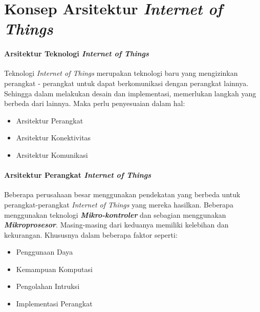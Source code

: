 

\section{Konsep Arsitektur \textit{Internet of Things}}
\begin{frame}{\insertsectionhead}
	\framesubtitle{Arsitektur Teknologi \textit{Internet of Things}}
	\justifying
	Teknologi \textit{Internet of Things} merupakan teknologi baru yang mengizinkan perangkat - perangkat untuk dapat berkomunikasi dengan perangkat lainnya. Sehingga dalam melakukan desain dan implementasi, memerlukan langkah yang berbeda dari lainnya. Maka perlu penyesuaian dalam hal:
	\begin{itemize}
		\item Arsitektur Perangkat
		\item Arsitektur Konektivitas
		\item Arsitektur Komunikasi
	\end{itemize}
\end{frame}

\begin{frame}{\insertsectionhead}
	\framesubtitle{Arsitektur Perangkat \textit{Internet of Things}}
	\justifying
	Beberapa perusahaan besar menggunakan pendekatan yang berbeda untuk perangkat-perangkat \textit{Internet of Things} yang mereka hasilkan. Beberapa menggunakan teknologi \textbf{\textit{Mikro-kontroler}} dan sebagian menggunakan \textbf{\textit{Mikroprosesor}}.
	\vfill
	Masing-masing dari keduanya memiliki kelebihan dan kekurangan. Khususnya dalam beberapa faktor seperti:
	\begin{itemize}
		\item Penggunaan Daya
		\item Kemampuan Komputasi
		\item Pengolahan Intruksi
		\item Implementasi Perangkat
	\end{itemize}
\end{frame}

